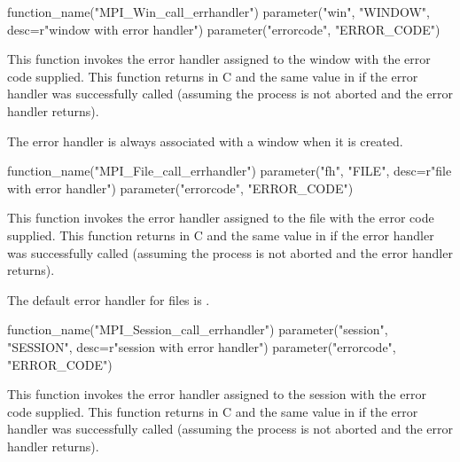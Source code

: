 \begin{mpi-binding}
    function_name("MPI_Win_call_errhandler")
    parameter("win", "WINDOW", desc=r"window with error handler")
    parameter("errorcode", "ERROR_CODE")
\end{mpi-binding}

This function invokes the error handler assigned to the window
with the error code supplied.  
This function returns  in C and the same
value in  if the error handler was successfully called
(assuming the process is not aborted and the error handler returns).

\begin{users}
The error handler  is always associated with a
window when it is created.
\end{users}

\begin{mpi-binding}
    function_name("MPI_File_call_errhandler")
    parameter("fh", "FILE", desc=r"file with error handler")
    parameter("errorcode", "ERROR_CODE")
\end{mpi-binding}

This function invokes the error handler assigned to the file
with the error code supplied.  
This function returns  in C and the same
value in  if the error handler was successfully called
(assuming the process is not aborted and the error handler returns).

\begin{users}
The default error handler for files is
.
\end{users}

\begin{mpi-binding}
    function_name("MPI_Session_call_errhandler")
    parameter("session", "SESSION", desc=r"session with error handler")
    parameter("errorcode", "ERROR_CODE")
\end{mpi-binding}

This function invokes the error handler assigned to the session
with the error code supplied.
This function returns  in C and the same
value in  if the error handler was successfully called
(assuming the process is not aborted and the error handler returns).


